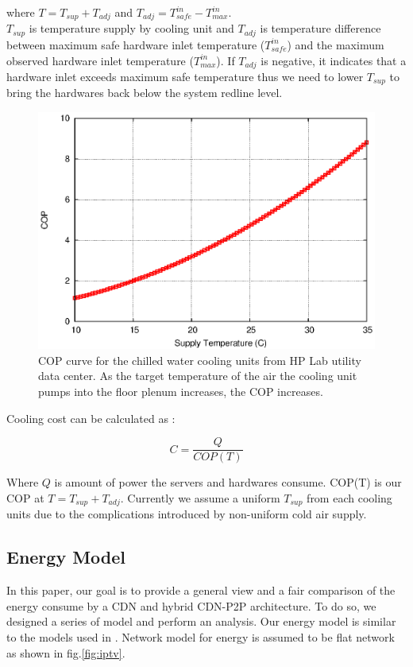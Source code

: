 \documentclass[JIP]{ipsj}
\begin{document}
where $T = T_{sup} + T_{adj}$ and $T_{adj} = T_{safe}^{in}-T_{max}^{in}$. \\
$T_{sup}$ is temperature supply by cooling unit and $T_{adj}$ is temperature difference between maximum safe hardware inlet temperature ($T_{safe}^{in}$) and the maximum observed hardware inlet temperature ($T_{max}^{in}$).
If $T_{adj}$ is negative, it indicates that a hardware inlet exceeds maximum safe temperature thus we need to lower $T_{sup}$ to bring the hardwares back below the system redline level.

\begin{figure}[thb]
\begin{center}
\includegraphics[scale=0.6]{graphs/cop.eps}
\end{center}
\caption{COP curve for the chilled water cooling units from HP Lab utility data center.
As the target temperature of the air the cooling unit pumps into the floor plenum increases, the COP increases.}
\label{fig:twotier}
\vspace{-2mm}
\end{figure} 

Cooling cost can be calculated as  \cite{moore2005making} :

\begin{equation}\label{eqn:cost}
C = \frac{Q}{COP(T)}
\end{equation}

Where $Q$ is amount of power the servers and hardwares consume.
COP(T) is our COP at $T=T_{sup}+T_{adj}$.
Currently we assume a uniform $T_{sup}$ from each cooling units due to the complications introduced by non-uniform cold air supply.


\subsection{Energy Model}\label{energy model}
In this paper, our goal is to provide a general view and a fair comparison of the energy consume by a CDN and hybrid CDN-P2P architecture. 
To do so, we designed a series of model and perform an analysis.
Our energy model is similar to the models used in \cite{Nedevschi:2008:HDC:1855610.1855618}.
Network model for energy is assumed to be flat network as shown in fig.\ref{fig:iptv}.
\end{document}
